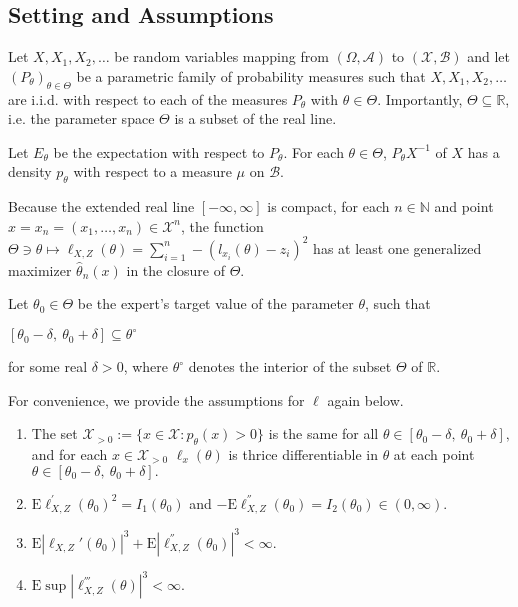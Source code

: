 \subsection*{Setting and Assumptions}

Let $X, X_1, X_2, \ldots$ be random variables mapping from $(\Omega, \mathcal{A})$ to $(\mathcal{X},\mathcal{B})$ and let $(P_{\theta})_{\theta\in \Theta}$ be a parametric family of probability measures such that $X, X_1, X_2, \ldots$ are i.i.d. with respect to each of the measures $P_{\theta}$ with $\theta \in \Theta$. Importantly, $\Theta\subseteq \mathbb{R}$, i.e. the parameter space $\Theta$ is a subset of the real line.

Let $E_{\theta}$ be the expectation with respect to $P_{\theta}$. For each $\theta\in \Theta$, $P_{\theta} X^{-1}$ of $X$ has a density $p_{\theta}$ with respect to a measure $\mu$ on $\mathcal{B}$.

Because the extended real line $[-\infty,\infty]$ is compact, for each $n\in \mathbb{N}$ and point $x=x_n=(x_1,\ldots,x_n)\in \mathcal{X}^n$, the function $\Theta\ni \theta\mapsto \ell_{X,Z}(\theta) = \sum_{i=1}^n -(l_{x_i}(\theta)-z_i)^2 $ has at least one generalized maximizer $\hat{\theta}_n(x)$ in the closure of $\Theta$.

Let $\theta_{0}\in \Theta$ be the expert's target value of the parameter $\theta$, such that
\begin{center}
	$[\theta_{0}-\delta,\ \theta_{0}+\delta]\subseteq \theta^{\circ}$ 
\end{center}
for some real $\delta>0$, where $\theta^{\circ}$ denotes the interior of the subset $\Theta$ of $\mathbb{R}$.

For convenience, we provide the assumptions for $\ell$ again below.

\begin{enumerate}
	\item The set $\mathcal{X}_{>0} :=\{x\in \mathcal{X}:p_{\theta}(x)>0\}$ is the same for all $\theta\in [\theta_{0}-\delta,\ \theta_{0}+\delta],$ and for each $x\in \mathcal{X}_{>0}$ $\ell_{x}(\theta)$ is thrice differentiable in $\theta$ at each point $\theta\in [\theta_{0}-\delta,\ \theta_{0}+\delta].$
	\item $\mathrm{E}\ell_{X,Z}^{'}(\theta_{0})^{2}=I_1(\theta_0)$ and $-\mathrm{E}\ell_{X,Z}^{''}(\theta_{0})=I_2(\theta_{0})\in (0,\infty)$.
	\item $\mathrm{E}|\ell_{X,Z}'(\theta_{0})|^{3}+\mathrm{E}|\ell_{X,Z}^{''}(\theta_{0})|^{3}<\infty.$
	\item $\mathrm{E} \sup |\ell_{X,Z}^{'''}(\theta)|^{3}<\infty.$
\end{enumerate}

